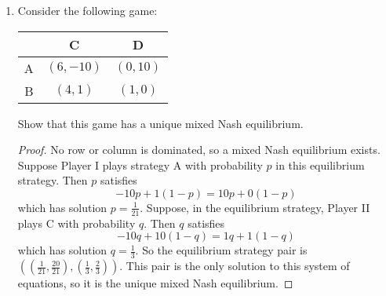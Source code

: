 \documentclass[10pt]{article}
\begin{document}
\begin{enumerate}
\begin{proof}
No row or column is dominated, so we must check for mixed strategy equilibria as well (by Lemma 3.3.6, if a domination occurred then the method we are about to apply would actually not lead to an equilibrium).  Let $p$ be the probability that Player I plays strategy 1.  There is one mixed strategy equilibrium, and it is of the form $((p,1-p), (p,1-p))$ because the game is symmetric.  $p$ can be found by solving
$$
8p + 3(1-p) = 10p + 0(1-p).
$$
The solution to this equation is $p = \frac35$, so the only mixed strategy equilibrium is $((\frac35, \frac25), (\frac35, \frac25))$.
\end{proof}

\item Consider the following game:
\\
\begin{center}
\begin{tabular}{|c|c|c|}
\hline 
 & C & D \\ 
\hline 
A & $(6,-10)$ & $(0,10)$ \\ 
\hline 
B & $(4,1)$ & $(1,0)$ \\ 
\hline 
\end{tabular}
\end{center}
Show that this game has a unique mixed Nash equilibrium.
\begin{proof}
No row or column is dominated, so a mixed Nash equilibrium exists.  Suppose Player I plays strategy A with probability $p$ in this equilibrium strategy.  Then $p$ satisfies
$$
-10p + 1(1-p) = 10p + 0(1-p)
$$
which has solution $p = \frac{1}{21}$.  Suppose, in the equilibrium strategy, Player II plays C with probability $q$.  Then $q$ satisfies
$$
-10q + 10(1-q) = 1q + 1(1-q)
$$
which has solution $q = \frac13$.  So the equilibrium strategy pair is $((\frac{1}{21}, \frac{20}{21}),(\frac13, \frac23))$.  This pair is the only solution to this system of equations, so it is the unique mixed Nash equilibrium.
\end{proof}


\end{enumerate}
\end{document}

